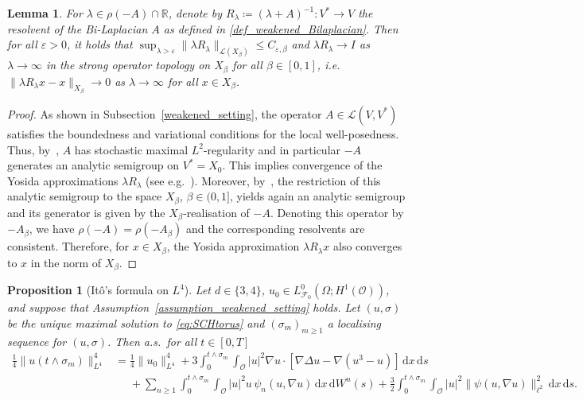\documentclass[reqno]{amsart}
\newtheorem{lemma}[Satz]{Lemma}
\newtheorem{proposition}[Satz]{Proposition}
\newcommand{\R}{\mathbb{R}}
\newcommand{\F}{\mathscr{F}}
\newcommand{\sL}{\mathscr{L}}
\newcommand{\sO}{\mathscr{O}}
\newcommand{\ce}{\coloneqq}
\newcommand{\1}{\mathbf{1}}
\newcommand{\grad}{\nabla}
\newcommand{\ds}{\,\mathrm{d}s}
\newcommand{\dx}{\,\mathrm{d}x}
\newcommand{\dWsn}{\,\mathrm{d}W^n(s)}
\newcommand{\inttm}{\int_0^{t\wedge\sigma_m}}
\begin{document}
\begin{lemma}
\label{lem:resolventBoundLambda}
    For $\lambda \in \rho(-A)\cap \R$, 
    denote by $R_\lambda \ce (\lambda+A)^{-1}:V^\ast\to V$ the resolvent of the Bi-Laplacian $A$ as defined in \eqref{def_weakened_Bilaplacian}. Then for all $\varepsilon>0$, it holds that $\sup_{\lambda>\varepsilon}\|\lambda R_\lambda\|_{\sL(X_\beta)}\le C_{\varepsilon,\beta}$ and $\lambda R_\lambda \to I$ as $\lambda \to \infty$ in the strong operator topology on $X_\beta$ for all $\beta\in [0,1]$, i.e.\ $\|\lambda R_\lambda x-x\|_{X_\beta} \to 0$ as $\lambda \to \infty$ for all $x \in X_\beta$. 
\end{lemma}
\begin{proof}
    As shown in Subsection~\ref{weakened_setting}, the operator $A\in \sL(V, V^\ast)$ satisfies the boundedness and variational conditions for the local well-posedness. Thus, by~\cite[Lemma~4.1]{agrestiCriticalVariationalSetting2024a}, $A$ has stochastic maximal $L^2$-regularity and in particular $-A$ generates an analytic semigroup on $V^\ast=X_0$. This implies convergence of the Yosida approximations $\lambda R_\lambda$ (see e.g.\ \cite[Prop.~10.1.7]{hytonenAnalysisBanachSpaces2017}). Moreover, by~\cite[Theorem~2.1.3]{amannLinearQuasilinearParabolic1995}, the restriction of this analytic semigroup to the space $X_\beta$, $\beta\in (0,1]$, yields again an analytic semigroup and its generator is given by the $X_\beta$-realisation of $-A$. Denoting this operator by $-A_{\beta}$, we have $\rho(-A)=\rho(-A_{\beta})$ and the corresponding resolvents are consistent. Therefore, for $x\in X_\beta$, the Yosida approximation $\lambda R_\lambda x$ also converges to $x$ in the norm of $X_\beta$. 
\end{proof}


\begin{proposition}[Itô's formula on $L^4$]
\label{prop:itoformulaL4}
    Let $d\in \{3,4\}$, $u_0\in L^0_{\F_0}(\Omega;H^1(\sO))$, and suppose that Assumption~\ref{assumption_weakened_setting} holds. Let $(u,\sigma)$ be the unique maximal solution to \eqref{eq:SCHtorus} and $(\sigma_m)_{m\ge 1}$ a localising sequence for $(u,\sigma)$. Then a.s.\ for all $t\in [0,T]$
    \begin{align}
    \label{eq:ItoFormulaL4}
        \frac{1}{4}\|u(t\wedge\sigma_m)\|_{L^4}^4 &=  \frac{1}{4}\|u_0\|_{L^4}^4 
        +3\inttm\int_{\sO} |u|^2 \grad u \cdot [\grad\Delta u- \grad(u^3-u)]\dx\ds\\
        &\phantom{= } + \sum_{n \geq 1} \inttm \int_{\sO}|u|^2 u \,\psi_n(u,\grad u) \dx \dWsn + \frac{3}{2} \inttm\int_{\sO} |u|^2 \|\psi(u,\grad u)\|_{\ell^2}^2 \dx \ds. \nonumber
\end{align}
\end{proposition}
\end{document}
